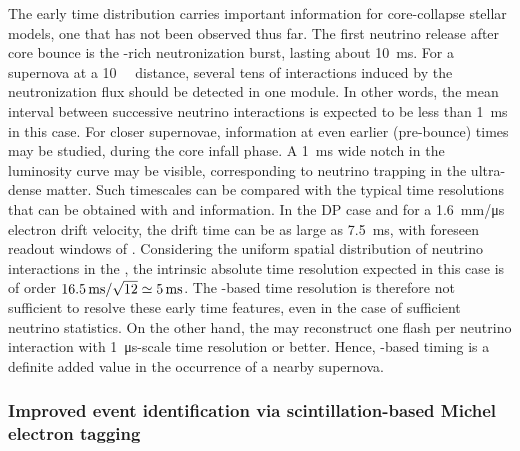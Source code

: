 The early time distribution carries important information for core-collapse stellar models, one that has not been observed thus far. The first neutrino release after core bounce is the \nue-rich neutronization burst, lasting about \SI{10}{\ms}. For a supernova at a \SI{10}{\kilo\parsec} distance, several tens of interactions induced by the neutronization flux should be detected in one  module. In other words, the mean interval between successive neutrino interactions is expected to be less than \SI{1}{\ms} in this case. For closer supernovae, information at even earlier (pre-bounce) times may be studied, during the core infall phase. A \SI{1}{\ms} wide notch in the luminosity curve may be visible, corresponding to neutrino trapping in the ultra-dense matter. Such timescales can be compared with the typical time resolutions that can be obtained with  and  information. In the DP  case and for a \SI{1.6}{mm/\micro\s} electron drift velocity, the drift time can be as large as \SI{7.5}{\ms}, with foreseen readout windows of \dpreadout. Considering the uniform spatial distribution of neutrino interactions in the , the intrinsic absolute time resolution expected in this case is of order $\dpreadout/\sqrt{12}\simeq \SI{5}{\ms}$. The -based time resolution is therefore not sufficient to resolve these early time features, even in the case of sufficient neutrino statistics. On the other hand, the  may reconstruct one flash per  neutrino interaction with \SI{1}{\micro\s}-scale time resolution or better. Hence, -based timing is a definite added value in the occurrence of a nearby supernova.

\subsubsection{Improved event identification via scintillation-based Michel electron tagging}

